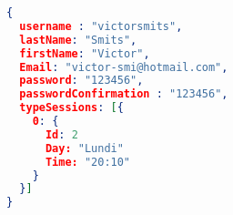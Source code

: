 \begin{lstlisting}[language=json,firstnumber=1]
{
  username : "victorsmits",
  lastName: "Smits",
  firstName: "Victor",
  Email: "victor-smi@hotmail.com",
  password: "123456",
  passwordConfirmation : "123456",
  typeSessions: [{
    0: {
      Id: 2
      Day: "Lundi"
      Time: "20:10"
    }
  }]
}
\end{lstlisting}